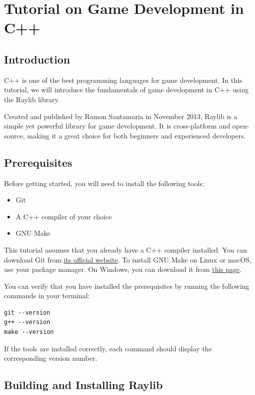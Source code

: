 \section{Tutorial on Game Development in C++}

\subsection{Introduction}

C++ is one of the best programming languages for game development. In this tutorial, we will introduce the fundamentals of game development in C++ using the Raylib library.

Created and published by Ramon Santamaria in November 2013, Raylib is a simple yet powerful library for game development. It is cross-platform and open-source, making it a great choice for both beginners and experienced developers.

\subsection{Prerequisites}

Before getting started, you will need to install the following tools:
\begin{itemize}
    \item Git
    \item A C++ compiler of your choice
    \item GNU Make
\end{itemize}

This tutorial assumes that you already have a C++ compiler installed. You can download Git from \href{https://git-scm.com/downloads}{its official website}. To install GNU Make on Linux or macOS, use your package manager. On Windows, you can download it from \href{https://gnuwin32.sourceforge.net/packages/make.htm}{this page}.

You can verify that you have installed the prerequisites by running the following commands in your terminal:
\begin{verbatim}
git --version
g++ --version
make --version
\end{verbatim}
If the tools are installed correctly, each command should display the corresponding version number.

\subsection{Building and Installing Raylib}

